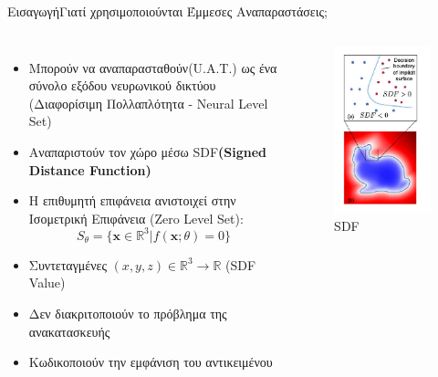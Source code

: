 \documentclass[10pt]{beamer}
\begin{document}
\begin{frame}{Εισαγωγή}{Γιατί χρησιμοποιούνται Έμμεσες Αναπαραστάσεις;}
    \begin{columns}
        \begin{itemize}
            \item Μπορούν να αναπαρασταθούν(U.A.T.) ως ένα σύνολο εξόδου νευρωνικού δικτύου (Διαφορίσιμη Πολλαπλότητα - Νeural Level Set) 
            \item Αναπαριστούν  τον χώρο μέσω SDF\textbf{(Signed Distance Function)}
            \item H επιθυμητή επιφάνεια ανιστοιχεί στην Ισομετρική Επιφάνεια (Zero Level Set): \[S_{\theta} = \{\textbf{x} \in\mathbb{R}^{3}  |  f(\textbf{x};\theta) = 0\}\]
            \item Συντεταγμένες \((x,y,z) \in \mathbb{R}^{3} \rightarrow  \mathbb{R} \) (SDF Value)
            \item Δεν διακριτοποιούν το πρόβλημα της ανακατασκευής
            \item  Κωδικοποιούν την εμφάνιση του αντικειμένου 
        \end{itemize}
        \begin{figure}
            \centering
            \includegraphics[height=0.6\textheight]{images/DeepSDFFields.jpg}
            \caption{SDF}
        \end{figure}
    \end{columns}
\end{frame}
\end{document}
